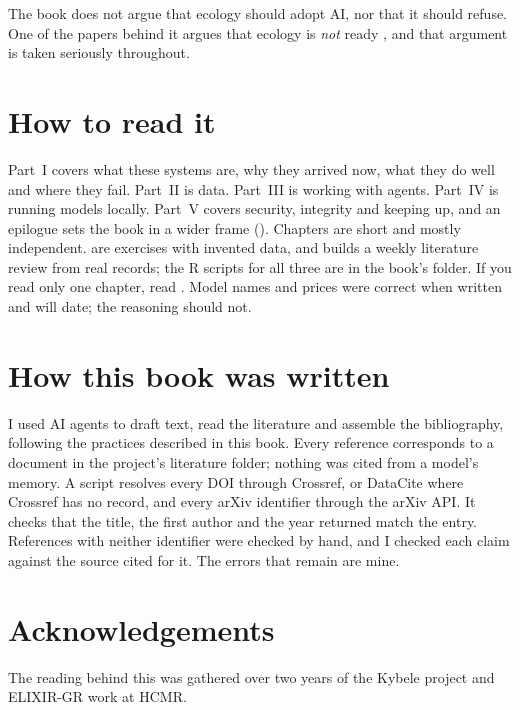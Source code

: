 The book does not argue that ecology should adopt AI, nor that it should
refuse. One of the papers behind it argues that ecology is \emph{not} ready
\parencite{mishra2026notready}, and that argument is taken seriously throughout.

\section*{How to read it}

Part~I covers what these systems are, why they arrived now, what they do well
and where they fail. Part~II is data. Part~III is working with agents. Part~IV
is running models locally. Part~V covers security, integrity and keeping up,
and an epilogue sets the book in a wider frame ().
Chapters are short and mostly independent. 
are exercises with invented data, and  builds a
weekly literature review from real records; the R scripts for all three are in
the book's  folder. If you read only one chapter, read
. Model names and prices were correct when written and will
date; the reasoning should not.

\section*{How this book was written}

I used AI agents to draft text, read the literature and assemble the
bibliography, following the practices described in this book. Every reference
corresponds to a document in the project's literature folder; nothing was cited
from a model's memory. A script resolves every DOI through Crossref, or
DataCite where Crossref has no record, and every arXiv identifier through the
arXiv API. It checks that the title, the first author and the year returned
match the entry. References with neither identifier were checked by hand, and
I checked each claim against the source cited for it. The errors that remain
are mine.

\section*{Acknowledgements}

The reading behind this was gathered over two years of the Kybele project and
ELIXIR-GR work at HCMR.
